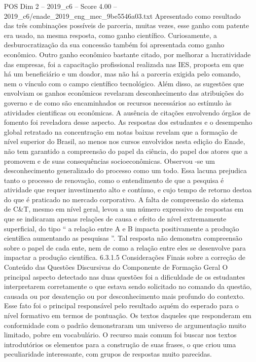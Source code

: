 \begin{textsample}{POS Dim 2 – 2019\_c6 – Score 4.00 – 2019\_c6/enade\_2019\_eng\_mec\_9be5546a03.txt}
Apresentado como resultado das três combinações possíveis de parceria, muitas vezes, esse ganho com patente era usado, na mesma resposta, como ganho científico.
Curiosamente, a desburocratização da sua concessão também foi apresentada como ganho econômico.
Outro ganho econômico bastante citado, por melhorar a lucratividade das empresas, foi a capacitação profissional realizada nas IES, proposta em que há um beneficiário e um doador, mas não há a parceria exigida pelo comando, nem o vínculo com o campo científico tecnológico.
Além disso, as sugestões que envolviam os ganhos econômicos revelaram desconhecimento das atribuições do governo e de como são encaminhados os recursos necessários ao estímulo às atividades cientificas ou econômicas.
A ausência de citações envolvendo órgãos de fomento foi reveladora desse aspecto.
As respostas dos estudantes e o desempenho global retratado na concentração em notas baixas revelam que a formação de nível superior do Brasil, ao menos nos cursos envolvidos nesta edição do Enade, não tem garantido a compreensão do papel da ciência, do papel dos atores que a promovem e de suas consequências socioeconômicas.
Observou -se um desconhecimento generalizado do processo como um todo.
Essa lacuna prejudica tanto o processo de renovação, como o entendimento de que a pesquisa é atividade que requer investimento alto e contínuo, e cujo tempo de retorno destoa do que é praticado no mercado corporativo.
A falta de compreensão do sistema de C\&T, mesmo em nível geral, levou a um número expressivo de respostas em que se indicaram apenas relações de causa e efeito de nível extremamente superficial, do tipo “ a relação entre A e B impacta positivamente a produção científica aumentando as pesquisas ”.
Tal resposta não demonstra compreensão sobre o papel de cada ente, nem de como a relação entre eles se desenvolve para impactar a produção científica. 6.3.1.5 Considerações Finais sobre a correção de Conteúdo das Questões Discursivas do Componente de Formação Geral O principal aspecto detectado nas duas questões foi a dificuldade de os estudantes interpretarem corretamente o que estava sendo solicitado no comando da questão, causada ou por desatenção ou por desconhecimento mais profundo do contexto.
Esse fato foi o principal responsável pelo resultado aquém do esperado para o nível formativo em termos de pontuação.
Os textos daqueles que responderam em conformidade com o padrão demonstraram um universo de argumentação muito limitado, pobre em vocabulário.
O recurso mais comum foi buscar nos textos introdutórios os elementos para a construção de suas frases, o que criou uma peculiaridade interessante, com grupos de respostas muito parecidas.

\end{textsample}

